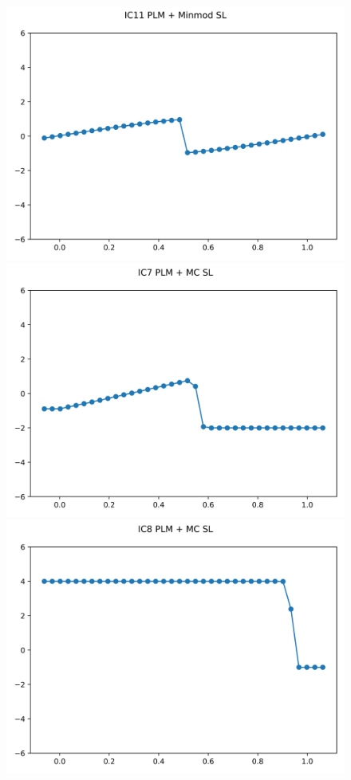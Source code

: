 \documentclass{article}
\begin{document}
\begin{figure}[t]
        \includegraphics[width=.95\textwidth]{../../code/IC11Methodpm_plot.png}
    \emp
        \centering
        \includegraphics[width=.95\textwidth]{../../code/IC7Methodpo_plot.png}
        \includegraphics[width=.95\textwidth]{../../code/IC8Methodpo_plot.png}

\end{figure}
\end{document}
